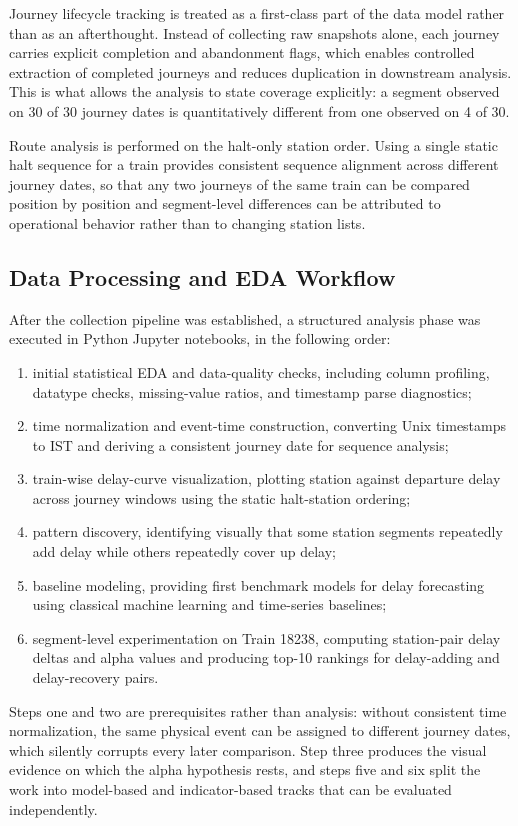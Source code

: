 \documentclass[conference]{IEEEtran}
\begin{document}
Journey lifecycle tracking is treated as a first-class part of the data model rather than as an afterthought. Instead of collecting raw snapshots alone, each journey carries explicit completion and abandonment flags, which enables controlled extraction of completed journeys and reduces duplication in downstream analysis. This is what allows the analysis to state coverage explicitly: a segment observed on 30 of 30 journey dates is quantitatively different from one observed on 4 of 30.

Route analysis is performed on the halt-only station order. Using a single static halt sequence for a train provides consistent sequence alignment across different journey dates, so that any two journeys of the same train can be compared position by position and segment-level differences can be attributed to operational behavior rather than to changing station lists.

\subsection{Data Processing and EDA Workflow}
After the collection pipeline was established, a structured analysis phase was executed in Python Jupyter notebooks, in the following order:
\begin{enumerate}
    \item initial statistical EDA and data-quality checks, including column profiling, datatype checks, missing-value ratios, and timestamp parse diagnostics;
    \item time normalization and event-time construction, converting Unix timestamps to IST and deriving a consistent journey date for sequence analysis;
    \item train-wise delay-curve visualization, plotting station against departure delay across journey windows using the static halt-station ordering;
    \item pattern discovery, identifying visually that some station segments repeatedly add delay while others repeatedly cover up delay;
    \item baseline modeling, providing first benchmark models for delay forecasting using classical machine learning and time-series baselines;
    \item segment-level experimentation on Train 18238, computing station-pair delay deltas and alpha values and producing top-10 rankings for delay-adding and delay-recovery pairs.
\end{enumerate}
Steps one and two are prerequisites rather than analysis: without consistent time normalization, the same physical event can be assigned to different journey dates, which silently corrupts every later comparison. Step three produces the visual evidence on which the alpha hypothesis rests, and steps five and six split the work into model-based and indicator-based tracks that can be evaluated independently.
\end{document}
